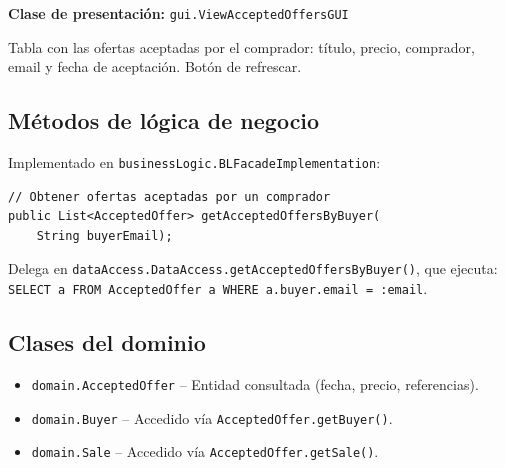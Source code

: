 \documentclass[12pt,a4paper]{article}
\begin{document}
\textbf{Clase de presentación:} \texttt{gui.ViewAcceptedOffersGUI}

Tabla con las ofertas aceptadas por el comprador: título, precio, comprador, email y fecha de aceptación. Botón de refrescar.

\subsection{Métodos de lógica de negocio}

Implementado en \texttt{businessLogic.BLFacadeImplementation}:

\begin{lstlisting}
// Obtener ofertas aceptadas por un comprador
public List<AcceptedOffer> getAcceptedOffersByBuyer(
    String buyerEmail);
\end{lstlisting}

Delega en \texttt{dataAccess.DataAccess.getAcceptedOffersByBuyer()}, que ejecuta:
\texttt{SELECT a FROM AcceptedOffer a WHERE a.buyer.email = :email}.

\subsection{Clases del dominio}

\begin{itemize}
    \item \texttt{domain.AcceptedOffer} -- Entidad consultada (fecha, precio, referencias).
    \item \texttt{domain.Buyer} -- Accedido vía \texttt{AcceptedOffer.getBuyer()}.
    \item \texttt{domain.Sale} -- Accedido vía \texttt{AcceptedOffer.getSale()}.
\end{itemize}
\end{document}
